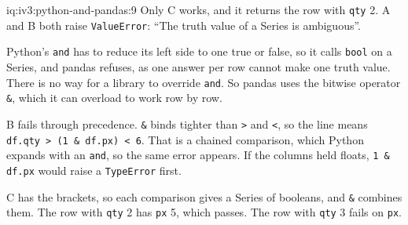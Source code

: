 \begin{solution}{iq:iv3:python-and-pandas:9}
Only C works, and it returns the row with \texttt{qty} 2. A and B both raise \texttt{ValueError}: ``The truth value of a Series is ambiguous''.

Python's \texttt{and} has to reduce its left side to one true or false, so it calls \texttt{bool} on a Series, and pandas refuses, as one answer per row cannot make one truth value. There is no way for a library to override \texttt{and}. So pandas uses the bitwise operator \texttt{\&}, which it can overload to work row by row.

B fails through precedence. \texttt{\&} binds tighter than \texttt{>} and \texttt{<}, so the line means \texttt{df.qty > (1 \& df.px) < 6}. That is a chained comparison, which Python expands with an \texttt{and}, so the same error appears. If the columns held floats, \texttt{1 \& df.px} would raise a \texttt{TypeError} first.

C has the brackets, so each comparison gives a Series of booleans, and \texttt{\&} combines them. The row with \texttt{qty} 2 has \texttt{px} 5, which passes. The row with \texttt{qty} 3 fails on \texttt{px}.

\end{solution}

